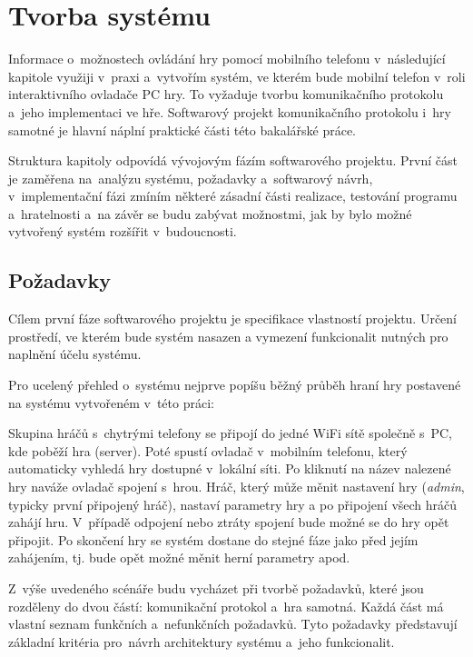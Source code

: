 \documentclass[thesis=B,czech,hidelinks]{FITthesis}[2012/06/26] %
\begin{document}
\chapter{Tvorba systému}
\label{chapter:implementation}

Informace o~možnostech ovládání hry pomocí mobilního telefonu v~následující kapitole využiji v~praxi a~vytvořím systém, ve kterém bude mobilní telefon v~roli interaktivního ovladače PC hry. To vyžaduje tvorbu komunikačního protokolu a~jeho implementaci ve hře. Softwarový projekt komunikačního protokolu i~hry samotné je hlavní náplní praktické části této bakalářské práce.

Struktura kapitoly odpovídá vývojovým fázím softwarového projektu. \cite{si} První část je zaměřena na~analýzu systému, požadavky a~softwarový návrh, v~implementační fázi zmíním některé zásadní části realizace, testování programu a~hratelnosti a~na závěr se budu zabývat možnostmi, jak by bylo možné vytvořený systém rozšířit v~budoucnosti.

\section{Požadavky}
\label{section:requirements}

Cílem první fáze softwarového projektu je specifikace vlastností projektu. Určení prostředí, ve kterém bude systém nasazen a vymezení funkcionalit nutných pro naplnění účelu systému.

Pro ucelený přehled o~systému nejprve popíšu běžný průběh hraní hry postavené na systému vytvořeném v~této práci:

Skupina hráčů s~chytrými telefony se připojí do jedné WiFi sítě společně s~PC, kde poběží hra (server). Poté spustí ovladač v~mobilním telefonu, který automaticky vyhledá hry dostupné v~lokální síti. Po kliknutí na název nalezené hry naváže ovladač spojení s~hrou. Hráč, který může měnit nastavení hry (\textit{admin}, typicky první připojený hráč), nastaví parametry hry a po připojení všech hráčů zahájí hru. V~případě odpojení nebo ztráty spojení bude možné se do hry opět připojit. Po skončení hry se systém dostane do stejné fáze jako před jejím zahájením, tj. bude opět možné měnit herní parametry apod.

Z~výše uvedeného scénáře budu vycházet při tvorbě požadavků, které jsou rozděleny do dvou částí: komunikační protokol a~hra samotná. Každá část má vlastní seznam funkčních a~nefunkčních požadavků. Tyto požadavky představují základní kritéria pro~návrh architektury systému a~jeho funkcionalit.
\end{document}
